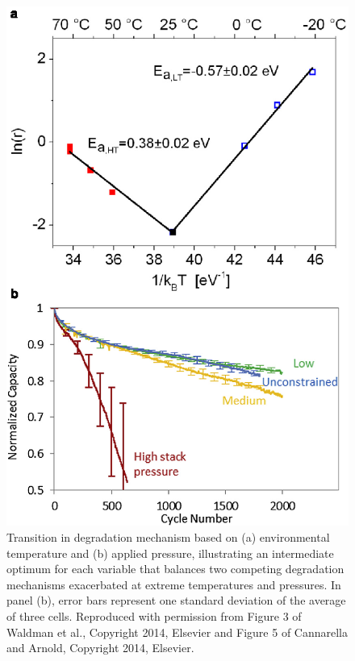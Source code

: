 \documentclass[journal=jpclcd,manuscript=article]{achemso}
\begin{document}
\begin{figure}[ht!]
\centering
\includegraphics[scale = 1.0]{figures/temperature_pressure_sweet_spot.eps}
\caption{Transition in degradation mechanism based on (a) environmental temperature and (b) applied pressure, illustrating an intermediate optimum for each variable that balances two competing degradation mechanisms exacerbated at extreme temperatures and pressures.
In panel (b), error bars represent one standard deviation of the average of three cells. 
Reproduced with permission from Figure 3 of Waldman et al.\cite{waldmann_temperature_2014}{}, Copyright 2014, Elsevier and Figure 5 of Cannarella and Arnold\cite{cannarella_stress_2014}{}, Copyright 2014, Elsevier.}
\label{fig:temperature_and_pressure}
\end{figure}
\end{document}

